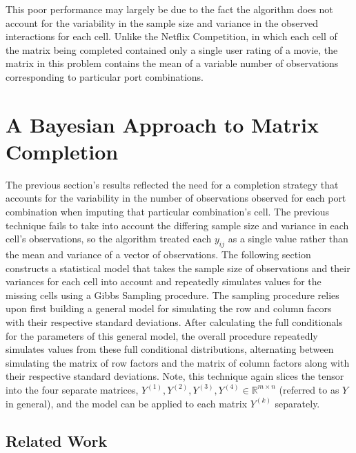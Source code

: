 \documentclass[12pt,twoside]{dukestatscithesis}
\theoremstyle{definition}
\theoremstyle{definition}
\theoremstyle{definition}
\theoremstyle{remark}
\begin{document}
This poor performance may largely be due to the fact the algorithm does
not account for the variability in the sample size and variance in the
observed interactions for each cell. Unlike the Netflix Competition, in
which each cell of the matrix being completed contained only a single
user rating of a movie, the matrix in this problem contains the mean of
a variable number of observations corresponding to particular port
combinations.

\chapter{A Bayesian Approach to Matrix
Completion}\label{a-bayesian-approach-to-matrix-completion}

The previous section's results reflected the need for a completion
strategy that accounts for the variability in the number of observations
observed for each port combination when imputing that particular
combination's cell. The previous technique fails to take into account
the differing sample size and variance in each cell's observations, so
the algorithm treated each \(y_{ij}\) as a single value rather than the
mean and variance of a vector of observations. The following section
constructs a statistical model that takes the sample size of
observations and their variances for each cell into account and
repeatedly simulates values for the missing cells using a Gibbs Sampling
procedure. The sampling procedure relies upon first building a general
model for simulating the row and column facors with their respective
standard deviations. After calculating the full conditionals for the
parameters of this general model, the overall procedure repeatedly
simulates values from these full conditional distributions, alternating
between simulating the matrix of row factors and the matrix of column
factors along with their respective standard deviations. Note, this
technique again slices the tensor into the four separate matrices,
\(Y^{(1)}, Y^{(2)}, Y^{(3)}, Y^{(4)} \in \mathbb{R}^{m \times n}\)
(referred to as \(Y\) in general), and the model can be applied to each
matrix \(Y^{(k)}\) separately.

\section{Related Work}\label{related-work-1}
\end{document}
